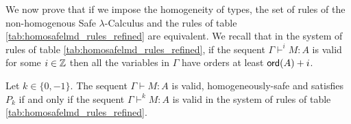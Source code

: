 We now prove that if we impose the homogeneity of types, the set of
rules of the non-homogenous Safe $\lambda$-Calculus and the rules of
table \ref{tab:homosafelmd_rules_refined} are equivalent.  We recall
that in the system of rules of table
\ref{tab:homosafelmd_rules_refined}, if the sequent $\Gamma
\vdash^{i} M : A$ is valid for some $i \in \mathbb{Z}$ then all the
variables in $\Gamma$ have orders at least ${\sf ord}(A)+i$.

\begin{prop}
\label{prop:nonhomogsafe_homog_restriction}
Let $k \in \{ 0, -1 \}$. The sequent $\Gamma \vdash M : A$ is valid, homogeneously-safe and satisfies $P_k$
if and only if the sequent $\Gamma \vdash^k M : A$ is valid in the system of rules of table \ref{tab:homosafelmd_rules_refined}.
\end{prop}

